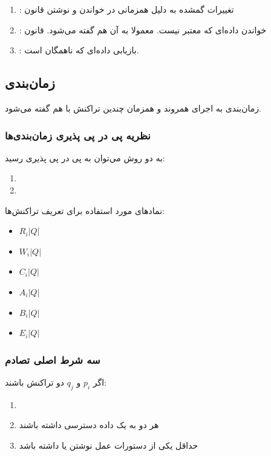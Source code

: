\documentclass[a4paper]{article}
\begin{document}
\begin{enumerate}
    \item {}: تغییرات گمشده به دلیل همزمانی در خواندن و نوشتن
    قانون 
    \item {}: خواندن داده‌ای که معتبر نیست. معمولا به آن  هم گفته می‌شود. قانون 
    \item {}: بازیابی داده‌ای که ناهمگان است. 
\end{enumerate}

\subsection{زمان‌بندی}

زمان‌بندی به اجرای همروند و همزمان چندین تراکنش با هم گفته می‌شود.

\subsubsection{نظریه پی در پی پذیری زمان‌بندی‌ها}

به دو روش می‌توان به پی در پی پذیری رسید:

\begin{enumerate}
    \item {}
    \item {}
\end{enumerate}

نماد‌های مورد استفاده برای تعریف تراکنش‌ها:

\begin{itemize}
    \item $R_{i}| Q |$
    \item $W_{i}| Q |$
    \item $C_{i}| Q |$
    \item $A_{i}| Q |$
    \item $B_{i}| Q |$
    \item $E_{i}| Q |$
\end{itemize}

\subsubsection{سه شرط اصلی تصادم}

اگر $p_{i}$ و $q_{j}$ دو تراکنش باشند:

\begin{enumerate}
    \item {}
    \item هر دو به یک داده دسترسی داشته باشند
    \item حداقل یکی از دستورات عمل نوشتن یا  داشته باشد
\end{enumerate}
\end{document}

